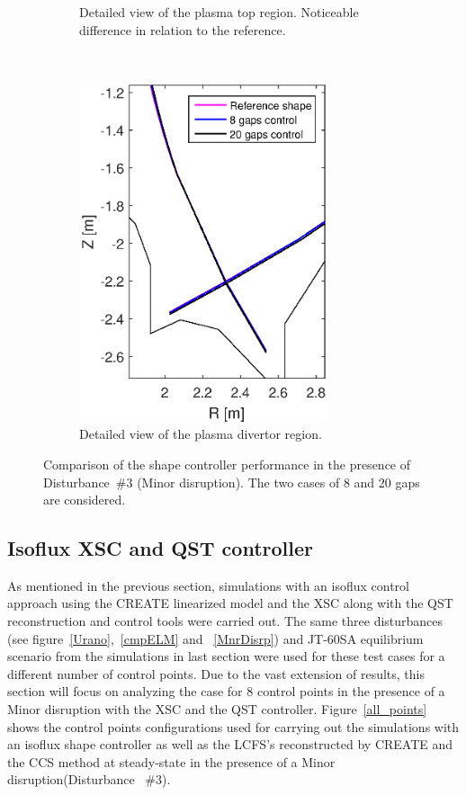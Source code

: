 \begin{figure}[h]
\begin{subfigure}[b]{0.33\textwidth}
		\caption{Detailed view of the plasma top region. Noticeable difference in relation to the reference. \label{figure:minor_top}}
	\end{subfigure}
	~
	\begin{subfigure}[b]{0.33\textwidth}
		\includegraphics[trim={1.0cm 0cm 1.25cm 0cm},clip,height=10.0cm]{Chp3/zoom_Ref_20gaps_8gaps_minor_strike_2.eps} 
		\caption{Detailed view of the plasma divertor region. \label{figure:minor_strike}}
	\end{subfigure}
	
	
	\caption{ Comparison of the shape controller performance in the presence of Disturbance~\#3 (Minor disruption). The two cases of 8 and 20 gaps are considered.}
	\label{figure:minor}
\end{figure}








\subsection{Isoflux XSC and QST controller }

As mentioned in the previous section, simulations with an isoflux control approach using the CREATE linearized model and the XSC along with the QST reconstruction and control tools were carried out. The same three disturbances (see figure~\ref{Urano},~\ref{cmpELM} and ~\ref{MnrDisrp}) and JT-60SA equilibrium scenario from the simulations in last section were used for these test cases for a different number of control points.  Due to the vast extension of results, this section will focus on analyzing the case for 8 control points in the presence of a Minor disruption with the XSC and the QST controller. Figure~\ref{all_points} shows the control points configurations used for carrying out the simulations with an isoflux shape controller as well as the LCFS's reconstructed by CREATE and  the CCS method at steady-state in the presence of a Minor disruption(Disturbance~ $\#3$). 
\smallskip

